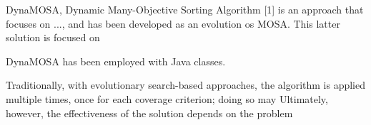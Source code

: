 DynaMOSA, Dynamic Many-Objective Sorting Algorithm [1] is an approach that focuses on ..., and has been developed as an evolution os MOSA.
This latter solution is focused on

DynaMOSA has been employed with Java classes.

Traditionally, with evolutionary search-based approaches, the algorithm is applied multiple times, 
once for each coverage criterion; doing so may 
Ultimately, however, the effectiveness of the solution depends on the problem